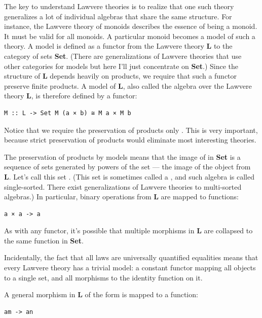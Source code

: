 The key to understand Lawvere theories is to realize that one such
theory generalizes a lot of individual algebras that share the same
structure. For instance, the Lawvere theory of monoids describes the
essence of being a monoid. It must be valid for all monoids. A
particular monoid becomes a model of such a theory. A model is defined
as a functor from the Lawvere theory \textbf{L} to the category of sets
\textbf{Set}. (There are generalizations of Lawvere theories that use
other categories for models but here I'll just concentrate on
\textbf{Set}.) Since the structure of \textbf{L} depends heavily on
products, we require that such a functor preserve finite products. A
model of \textbf{L}, also called the algebra over the Lawvere theory
\textbf{L}, is therefore defined by a functor:

\begin{verbatim}
M :: L -> Set M (a × b) ≅ M a × M b
\end{verbatim}

Notice that we require the preservation of products only . This is very important, because strict preservation of
products would eliminate most interesting theories.

The preservation of products by models means that the image of
 in \textbf{Set} is a sequence of sets generated by powers of
the set  --- the image of the object  from
\textbf{L}. Let's call this set . (This set is sometimes
called a , and such algebra is called single-sorted. There
exist generalizations of Lawvere theories to multi-sorted algebras.) In
particular, binary operations from \textbf{L} are mapped to functions:

\begin{verbatim}
a × a -> a
\end{verbatim}

As with any functor, it's possible that multiple morphisms in \textbf{L}
are collapsed to the same function in \textbf{Set}.

Incidentally, the fact that all laws are universally quantified
equalities means that every Lawvere theory has a trivial model: a
constant functor mapping all objects to a single set, and all morphisms
to the identity function on it.

A general morphism in \textbf{L} of the form
 is mapped to a function:

\begin{verbatim}
am -> an
\end{verbatim}

